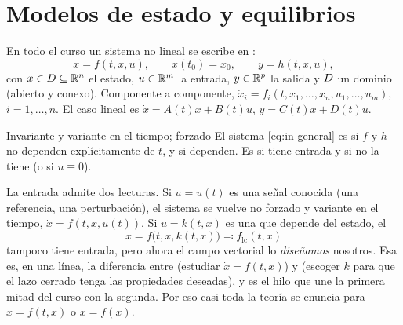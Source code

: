 \section{Modelos de estado y equilibrios}
\label{sec:in-modelos}

En todo el curso un sistema no lineal se escribe en :
\begin{equation}
  \dot x=f(t,x,u),\qquad x(t_0)=x_0,\qquad y=h(t,x,u),
  \label{eq:in-general}
\end{equation}
con $x\in D\subseteq\mathbb{R}^n$ el estado, $u\in\mathbb{R}^m$ la entrada, $y\in\mathbb{R}^p$ la salida y $D$ un dominio (abierto y conexo). Componente a componente, $\dot x_i=f_i(t,x_1,\dots,x_n,u_1,\dots,u_m)$, $i=1,\dots,n$.
El caso lineal es $\dot x=A(t)x+B(t)u$, $y=C(t)x+D(t)u$.

\begin{definicion}[label=def:in-invariante]{Invariante y variante en el tiempo; forzado}
El sistema \eqref{eq:in-general} es  si $f$ y $h$ no dependen explícitamente de $t$, y  si dependen. Es  si tiene entrada y  si no la tiene (o si $u\equiv0$).
\end{definicion}

La entrada admite dos lecturas. Si $u=u(t)$ es una señal conocida (una referencia, una perturbación), el sistema se vuelve no forzado y variante en el tiempo, $\dot x=f(t,x,u(t))$. Si $u=k(t,x)$ es una  que depende del estado, el 
\begin{equation}
  \dot x=f\bigl(t,x,k(t,x)\bigr)\eqqcolon f_{\mathrm{lc}}(t,x)
  \label{eq:in-lazo}
\end{equation}
tampoco tiene entrada, pero ahora el campo vectorial lo \emph{diseñamos} nosotros. Esa es, en una línea, la diferencia entre  (estudiar $\dot x=f(t,x)$) y  (escoger $k$ para que el lazo cerrado tenga las propiedades deseadas), y es el hilo que une la primera mitad del curso con la segunda. Por eso casi toda la teoría se enuncia para $\dot x=f(t,x)$ o $\dot x=f(x)$.

